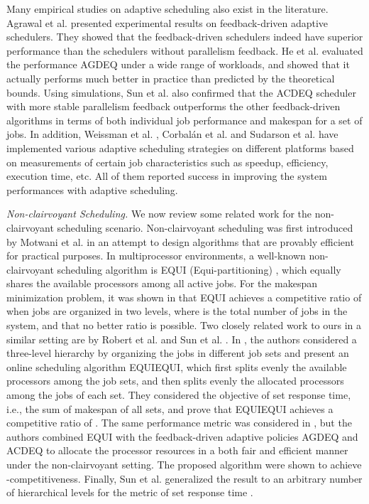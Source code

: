 \documentclass[10pt, a4paper]{article}
\begin{document}
Many empirical studies on adaptive scheduling also exist in the literature. Agrawal et al.
\cite{AgrawalHeLe06} presented experimental results on feedback-driven adaptive schedulers. They
showed that the feedback-driven schedulers indeed have superior performance than the schedulers
without parallelism feedback. He et al. \cite{HeHsLe08} evaluated the performance AGDEQ under a
wide range of workloads, and showed that it actually performs much better in practice than
predicted by the theoretical bounds. Using simulations, Sun et al. \cite{SunCaHs11} also confirmed
that the ACDEQ scheduler with more stable parallelism feedback outperforms the other
feedback-driven algorithms in terms of both individual job performance and makespan for a set of
jobs. In addition, Weissman et al. \cite{WeissmanAbEn03}, Corbal\'{a}n et al. \cite{CorbalanMaLa05}
and Sudarson et al. \cite{Sudarsan07} have implemented various adaptive scheduling strategies on
different platforms based on measurements of certain job characteristics such as speedup,
efficiency, execution time, etc. All of them reported success in improving the system performances
with adaptive scheduling.

\emph{Non-clairvoyant Scheduling.} We now review some related work for the non-clairvoyant
scheduling scenario. Non-clairvoyant scheduling was first introduced by Motwani et al.
\cite{MotwaniPhTo94} in an attempt to design algorithms that are provably efficient for practical
purposes. In multiprocessor environments, a well-known non-clairvoyant scheduling algorithm is EQUI
(Equi-partitioning) \cite{Edmonds99,EdmondsChBr03}, which equally shares the available processors
among all active jobs. For the makespan minimization problem, it was shown in \cite{RobertSc07}
that EQUI achieves a competitive ratio of  when jobs are organized
in two levels, where  is the total number of jobs in the system, and that no better ratio is
possible. Two closely related work to ours in a similar setting are by Robert et al.
\cite{RobertSc07} and Sun et al. \cite{SunCaHs11-2, SunHsCa14}. In \cite{RobertSc07}, the authors considered a
three-level hierarchy by organizing the jobs in different job sets and present an online scheduling
algorithm EQUIEQUI, which first splits evenly the available processors among the job sets,
and then splits evenly the allocated processors among the jobs of each set. They considered the
objective of set response time, i.e., the sum of makespan of all sets, and prove that
EQUIEQUI achieves a competitive ratio of . The same performance metric was considered in
\cite{SunCaHs11-2}, but the authors combined EQUI with
the feedback-driven adaptive policies AGDEQ \cite{HeHsLe08} and ACDEQ \cite{SunCaHs11} to allocate the
processor resources in a both fair and efficient manner under the non-clairvoyant setting. The proposed algorithm were shown to achieve -competitiveness.
Finally, Sun et al. \cite{SunHsCa14} generalized the result to an arbitrary number of hierarchical levels for the metric of set response time . 
\end{document}
